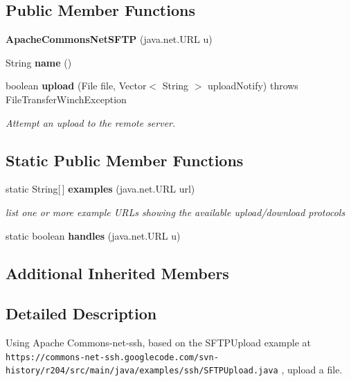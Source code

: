 \subsection*{Public Member Functions}
\begin{DoxyCompactItemize}
\item 
{\bfseries Apache\-Commons\-Net\-S\-F\-T\-P} (java.\-net.\-U\-R\-L u)\label{classorg_1_1smallfoot_1_1filexfer_1_1ApacheCommonsNetSFTP_a67d38a2fe0500ee93a9613fc011497b4}

\item 
String {\bfseries name} ()\label{classorg_1_1smallfoot_1_1filexfer_1_1ApacheCommonsNetSFTP_afa2149aced9d90555f788dfc81c23d15}

\item 
boolean {\bf upload} (File file, Vector$<$ String $>$ upload\-Notify)  throws File\-Transfer\-Winch\-Exception     
\begin{DoxyCompactList}\small\item\em Attempt an upload to the remote server. \end{DoxyCompactList}\end{DoxyCompactItemize}
\subsection*{Static Public Member Functions}
\begin{DoxyCompactItemize}
\item 
static String[$\,$] {\bf examples} (java.\-net.\-U\-R\-L url)
\begin{DoxyCompactList}\small\item\em list one or more example U\-R\-Ls showing the available upload/download protocols \end{DoxyCompactList}\item 
static boolean {\bfseries handles} (java.\-net.\-U\-R\-L u)\label{classorg_1_1smallfoot_1_1filexfer_1_1ApacheCommonsNetSFTP_a4ef8d35ab128080eb511f7e26cd7ab7b}

\end{DoxyCompactItemize}
\subsection*{Additional Inherited Members}


\subsection{Detailed Description}
Using Apache Commons-\/net-\/ssh, based on the S\-F\-T\-P\-Upload example at {\tt https\-://commons-\/net-\/ssh.\-googlecode.\-com/svn-\/history/r204/src/main/java/examples/ssh/\-S\-F\-T\-P\-Upload.\-java} , upload a file. 

